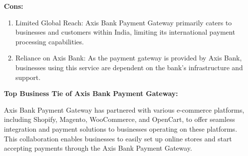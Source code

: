 \textbf{Cons:}

\begin{enumerate}
  \item Limited Global Reach: Axis Bank Payment Gateway primarily caters to businesses and customers within India, limiting its international payment processing capabilities.
  \item Reliance on Axis Bank: As the payment gateway is provided by Axis Bank, businesses using this service are dependent on the bank's infrastructure and support.
\end{enumerate}

\textbf{Top Business Tie of Axis Bank Payment Gateway:}

Axis Bank Payment Gateway has partnered with various e-commerce platforms, including Shopify, Magento, WooCommerce, and OpenCart, to offer seamless integration and payment solutions to businesses operating on these platforms. This collaboration enables businesses to easily set up online stores and start accepting payments through the Axis Bank Payment Gateway.


